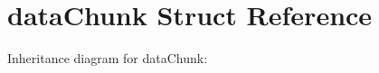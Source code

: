 \hypertarget{structdataChunk}{}\section{data\+Chunk Struct Reference}
\label{structdataChunk}


Inheritance diagram for data\+Chunk\+:
